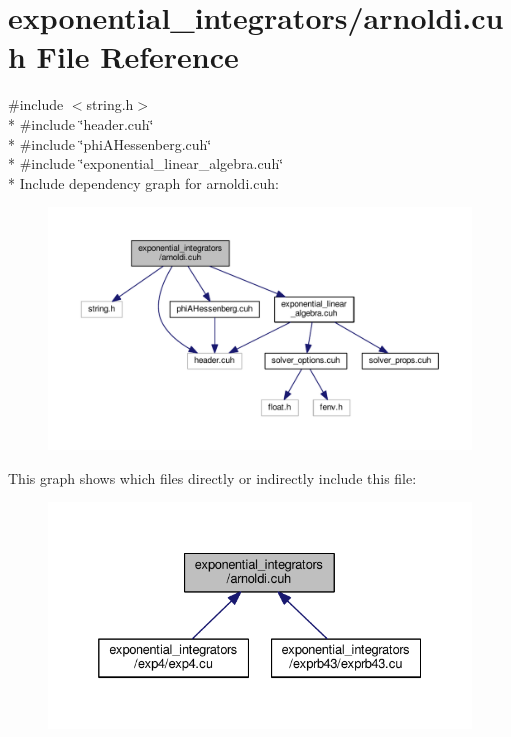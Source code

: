 \hypertarget{arnoldi_8cuh}{}\section{exponential\+\_\+integrators/arnoldi.cuh File Reference}
\label{arnoldi_8cuh}
{\ttfamily \#include $<$string.\+h$>$}\\*
{\ttfamily \#include \char`\"{}header.\+cuh\char`\"{}}\\*
{\ttfamily \#include \char`\"{}phi\+A\+Hessenberg.\+cuh\char`\"{}}\\*
{\ttfamily \#include \char`\"{}exponential\+\_\+linear\+\_\+algebra.\+cuh\char`\"{}}\\*
Include dependency graph for arnoldi.\+cuh\+:\nopagebreak
\begin{figure}[H]
\begin{center}
\leavevmode
\includegraphics[width=350pt]{arnoldi_8cuh__incl}
\end{center}
\end{figure}
This graph shows which files directly or indirectly include this file\+:\nopagebreak
\begin{figure}[H]
\begin{center}
\leavevmode
\includegraphics[width=332pt]{arnoldi_8cuh__dep__incl}
\end{center}
\end{figure}
